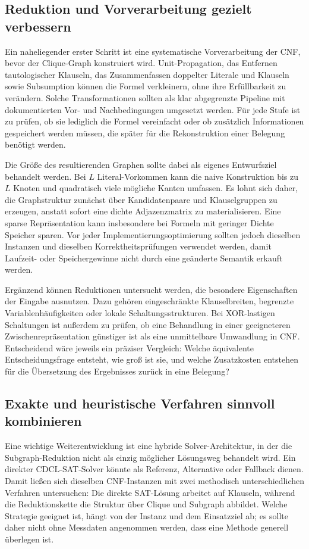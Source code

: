 \documentclass[a4paper,12pt]{article}
\theoremstyle{definition}
\begin{document}
\subsection{Reduktion und Vorverarbeitung gezielt verbessern}
Ein naheliegender erster Schritt ist eine systematische Vorverarbeitung der CNF, bevor der Clique-Graph konstruiert wird. Unit-Propagation, das Entfernen tautologischer Klauseln, das Zusammenfassen doppelter Literale und Klauseln sowie Subsumption können die Formel verkleinern, ohne ihre Erfüllbarkeit zu verändern. Solche Transformationen sollten als klar abgegrenzte Pipeline mit dokumentierten Vor- und Nachbedingungen umgesetzt werden. Für jede Stufe ist zu prüfen, ob sie lediglich die Formel vereinfacht oder ob zusätzlich Informationen gespeichert werden müssen, die später für die Rekonstruktion einer Belegung benötigt werden.

Die Größe des resultierenden Graphen sollte dabei als eigenes Entwurfsziel behandelt werden. Bei $L$ Literal-Vorkommen kann die naive Konstruktion bis zu $L$ Knoten und quadratisch viele mögliche Kanten umfassen. Es lohnt sich daher, die Graphstruktur zunächst über Kandidatenpaare und Klauselgruppen zu erzeugen, anstatt sofort eine dichte Adjazenzmatrix zu materialisieren. Eine sparse Repräsentation kann insbesondere bei Formeln mit geringer Dichte Speicher sparen. Vor jeder Implementierungsoptimierung sollten jedoch dieselben Instanzen und dieselben Korrektheitsprüfungen verwendet werden, damit Laufzeit- oder Speichergewinne nicht durch eine geänderte Semantik erkauft werden.

Ergänzend können Reduktionen untersucht werden, die besondere Eigenschaften der Eingabe ausnutzen. Dazu gehören eingeschränkte Klauselbreiten, begrenzte Variablenhäufigkeiten oder lokale Schaltungsstrukturen. Bei XOR-lastigen Schaltungen ist außerdem zu prüfen, ob eine Behandlung in einer geeigneteren Zwischenrepräsentation günstiger ist als eine unmittelbare Umwandlung in CNF. Entscheidend wäre jeweils ein präziser Vergleich: Welche äquivalente Entscheidungsfrage entsteht, wie groß ist sie, und welche Zusatzkosten entstehen für die Übersetzung des Ergebnisses zurück in eine Belegung?

\subsection{Exakte und heuristische Verfahren sinnvoll kombinieren}
Eine wichtige Weiterentwicklung ist eine hybride Solver-Architektur, in der die Subgraph-Reduktion nicht als einzig möglicher Lösungsweg behandelt wird. Ein direkter CDCL-SAT-Solver könnte als Referenz, Alternative oder Fallback dienen. Damit ließen sich dieselben CNF-Instanzen mit zwei methodisch unterschiedlichen Verfahren untersuchen: Die direkte SAT-Lösung arbeitet auf Klauseln, während die Reduktionskette die Struktur über Clique und Subgraph abbildet. Welche Strategie geeignet ist, hängt von der Instanz und dem Einsatzziel ab; es sollte daher nicht ohne Messdaten angenommen werden, dass eine Methode generell überlegen ist.
\end{document}

